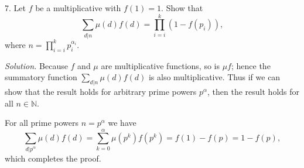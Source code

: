 \documentclass{article}
\newcommand{\N}{\mathbb{N}}
\begin{document}
\newpage

7. Let $f$ be a multiplicative with $f(1) = 1$. Show that
%
\begin{equation*}
    \sum_{d|n} \mu(d) f(d) = \prod_{i = i}^k (1 - f(p_i))
    ,
\end{equation*}
%
where $n = \prod_{i = i}^k p_i^{\alpha_i}$.

\textit{Solution.}
Because $f$ and $\mu$ are multiplicative functions, so is $\mu f$;
hence the summatory function $\sum_{d|n} \mu(d) f(d)$ is also
multiplicative. Thus if we can show that the result holds
for arbitrary prime powers $p^\alpha$, then the result holds for all
$n \in \N$.

For all prime powers $n = p^\alpha$ we have
%
\begin{equation*}
    \sum_{d|p^\alpha} \mu(d) f(d)
        = \sum_{k = 0}^\alpha \mu(p^k) f(p^k)
        = f(1) - f(p)
        = 1 - f(p)
    ,
\end{equation*}
%
which completes the proof.
\end{document}
